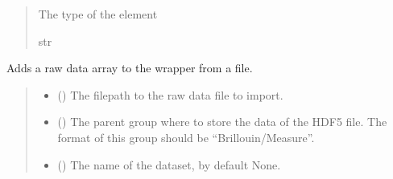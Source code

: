 \documentclass[letterpaper,10pt,english]{sphinxmanual}
\begin{document}
\begin{fulllineitems}
\begin{fulllineitems}
\begin{quote}
\begin{description}
\sphinxAtStartPar
The type of the element

\sphinxAtStartPar
str

\end{description}\end{quote}

\end{fulllineitems}


\begin{fulllineitems}
\label{\detokenize{_autosummary/HDF5_BLS.wrapper:HDF5_BLS.wrapper.Wrapper.import_other}}
\pysigstartsignatures
\pysiglinewithargsret
{}
{\sphinxparamcomma {}\sphinxparamcomma {}\sphinxparamcomma {}\sphinxparamcomma {}\sphinxparamcomma {}\sphinxparamcomma {}}
{}
\pysigstopsignatures
\sphinxAtStartPar
Adds a raw data array to the wrapper from a file.
\begin{quote}\begin{description}
\begin{itemize}
\item {} 
\sphinxAtStartPar
{} () \textendash{} The filepath to the raw data file to import.

\item {} 
\sphinxAtStartPar
{} (\sphinxstyleliteralemphasis{\sphinxupquote{, }}) \textendash{} The parent group where to store the data of the HDF5 file. The format of this group should be “Brillouin/Measure”.

\item {} 
\sphinxAtStartPar
{} (\sphinxstyleliteralemphasis{\sphinxupquote{, }}) \textendash{} The name of the dataset, by default None.


\end{itemize}
\end{description}
\end{quote}
\end{fulllineitems}
\end{fulllineitems}
\end{document}
